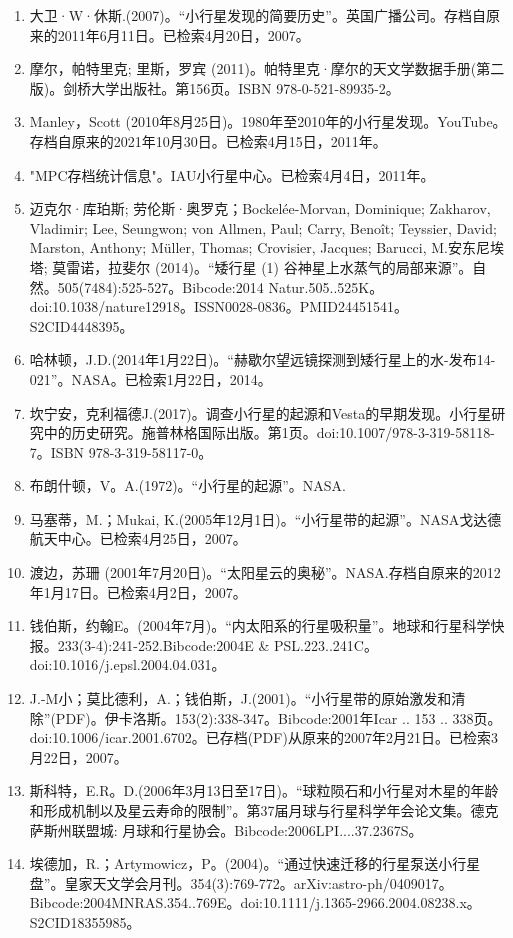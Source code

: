 \begin{enumerate}
\item 大卫·W·休斯.(2007)。“小行星发现的简要历史”。英国广播公司。存档自原来的2011年6月11日。已检索4月20日，2007。
\item 摩尔，帕特里克; 里斯，罗宾 (2011)。帕特里克·摩尔的天文学数据手册(第二版)。剑桥大学出版社。第156页。ISBN 978-0-521-89935-2。
\item Manley，Scott (2010年8月25日)。1980年至2010年的小行星发现。YouTube。存档自原来的2021年10月30日。已检索4月15日，2011年。
\item "MPC存档统计信息"。IAU小行星中心。已检索4月4日，2011年。
\item 迈克尔·库珀斯; 劳伦斯·奥罗克；Bockelée-Morvan, Dominique; Zakharov, Vladimir; Lee, Seungwon; von Allmen, Paul; Carry, Benoît; Teyssier, David; Marston, Anthony; Müller, Thomas; Crovisier, Jacques; Barucci, M.安东尼埃塔; 莫雷诺，拉斐尔 (2014)。“矮行星 (1) 谷神星上水蒸气的局部来源”。自然。505(7484):525-527。Bibcode:2014 Natur.505..525K。doi:10.1038/nature12918。ISSN0028-0836。PMID24451541。S2CID4448395。   
\item 哈林顿，J.D.(2014年1月22日)。“赫歇尔望远镜探测到矮行星上的水-发布14-021”。NASA。已检索1月22日，2014。
\item 坎宁安，克利福德J.(2017)。调查小行星的起源和Vesta的早期发现。小行星研究中的历史研究。施普林格国际出版。第1页。doi:10.1007/978-3-319-58118-7。ISBN 978-3-319-58117-0。
\item 布朗什顿，V。A.(1972)。“小行星的起源”。NASA.
\item 马塞蒂，M.；Mukai, K.(2005年12月1日)。“小行星带的起源”。NASA戈达德航天中心。已检索4月25日，2007。
\item 渡边，苏珊 (2001年7月20日)。“太阳星云的奥秘”。NASA.存档自原来的2012年1月17日。已检索4月2日，2007。
\item 钱伯斯，约翰E。(2004年7月)。“内太阳系的行星吸积量”。地球和行星科学快报。233(3-4):241-252.Bibcode:2004E & PSL.223..241C。doi:10.1016/j.epsl.2004.04.031。
\item J.-M小；莫比德利，A.；钱伯斯，J.(2001)。“小行星带的原始激发和清除”(PDF)。伊卡洛斯。153(2):338-347。Bibcode:2001年Icar .. 153 .. 338页。doi:10.1006/icar.2001.6702。已存档(PDF)从原来的2007年2月21日。已检索3月22日，2007。
\item 斯科特，E.R。D.(2006年3月13日至17日)。“球粒陨石和小行星对木星的年龄和形成机制以及星云寿命的限制”。第37届月球与行星科学年会论文集。德克萨斯州联盟城: 月球和行星协会。Bibcode:2006LPI....37.2367S。
\item 埃德加，R.；Artymowicz，P。(2004)。“通过快速迁移的行星泵送小行星盘”。皇家天文学会月刊。354(3):769-772。arXiv:astro-ph/0409017。Bibcode:2004MNRAS.354..769E。doi:10.1111/j.1365-2966.2004.08238.x。S2CID18355985。 

\end{enumerate}
